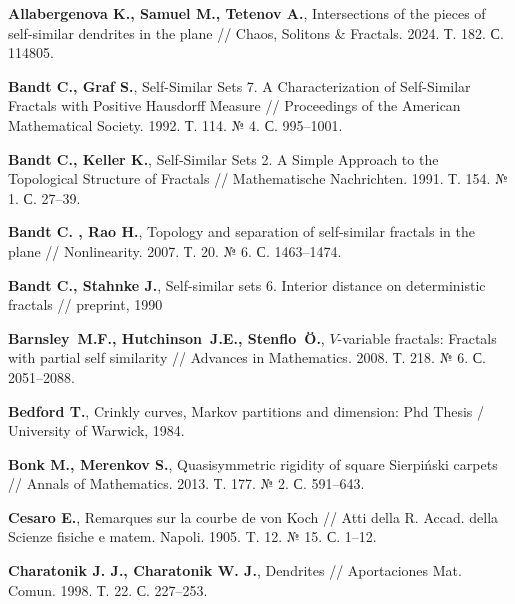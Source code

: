 %
%




\begin{thebibliography}{99}

{\bf Allabergenova K., Samuel M., Tetenov A.}, 
Intersections of the pieces of self-similar dendrites in the plane //
Chaos, Solitons \& Fractals. 2024. Т. 182. С. 114805.

{\bf Bandt C., Graf S.},
Self-Similar Sets 7. A Characterization of Self-Similar Fractals with Positive Hausdorff Measure // 
Proceedings of the American Mathematical Society. 1992. Т. 114. № 4. С. 995--1001.

{\bf Bandt C., Keller K.},
Self‐Similar Sets 2. A Simple Approach to the Topological Structure of Fractals // 
Mathematische Nachrichten. 1991. Т. 154. № 1. С. 27--39.

  {\bf Bandt C. , Rao H.},
Topology and separation of self-similar fractals in the plane // 
Nonlinearity. 2007. Т. 20. № 6. С. 1463--1474.

{\bf Bandt C., Stahnke J.},
Self-similar sets 6. Interior distance on deterministic fractals //
preprint, 1990

{\bf Barnsley~M.F., Hutchinson~J.E., Stenflo~\"O.},
$V$-variable fractals: Fractals with partial self similarity //
Advances in Mathematics. 2008. Т. 218. № 6. С. 2051--2088.

{\bf Bedford T.},
Crinkly curves, Markov partitions and dimension: Phd Thesis / 
University of Warwick, 1984.

{\bf Bonk M., Merenkov S.}, 
Quasisymmetric rigidity of square Sierpiński carpets // 
Annals of Mathematics. 2013. Т. 177. № 2. С. 591--643.

{\bf Cesaro E.}, 
Remarques sur la courbe de von Koch // 
Atti della R. Accad. della Scienze fisiche e matem. Napoli. 1905. T. 12. № 15. С. 1--12.

{\bf Charatonik J. J., Charatonik W. J.},
Dendrites // 
Aportaciones Mat. Comun. 1998. Т. 22. С. 227--253.


\end{thebibliography}
